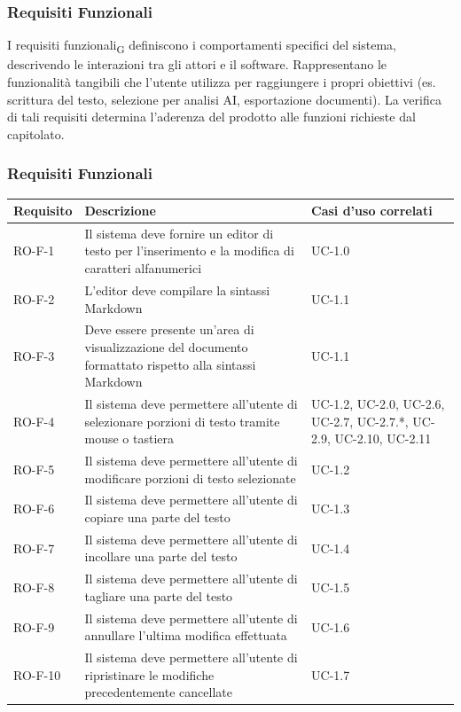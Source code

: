 \documentclass[11pt,a4paper]{article}
\begin{document}
\subsubsection{Requisiti Funzionali}
I requisiti funzionali\textsubscript{G} definiscono i comportamenti specifici del sistema, descrivendo le interazioni tra gli attori e il software.
Rappresentano le funzionalità tangibili che l'utente utilizza per raggiungere i propri obiettivi (es. scrittura del testo, selezione per analisi AI, esportazione documenti). La verifica di tali requisiti determina l'aderenza del prodotto alle funzioni richieste dal capitolato.

\subsubsection{Requisiti Funzionali}
\begin{longtable}{|p{}|>{\raggedright\arraybackslash}p{}|p{}|}
\hline
\textbf{Requisito} & \textbf{Descrizione} & \textbf{Casi d'uso correlati}\\
\hline
\endhead
RO-F-1 & Il sistema deve fornire un editor di testo per l'inserimento e la modifica di caratteri alfanumerici & UC-1.0 \\
\hline
RO-F-2 & L'editor deve compilare la sintassi Markdown & UC-1.1 \\
\hline
RO-F-3 & Deve essere presente un'area di visualizzazione del documento formattato rispetto alla sintassi Markdown & UC-1.1 \\
\hline
RO-F-4 & Il sistema deve permettere all'utente di selezionare porzioni di testo tramite mouse o tastiera & UC-1.2, UC-2.0, UC-2.6, UC-2.7, UC-2.7.*, UC-2.9, UC-2.10, UC-2.11 \\
\hline
RO-F-5 & Il sistema deve permettere all'utente di modificare porzioni di testo selezionate & UC-1.2 \\
\hline
RO-F-6 & Il sistema deve permettere all'utente di copiare una parte del testo & UC-1.3 \\
\hline
RO-F-7 & Il sistema deve permettere all'utente di incollare una parte del testo & UC-1.4 \\
\hline
RO-F-8 & Il sistema deve permettere all'utente di tagliare una parte del testo & UC-1.5 \\
\hline
RO-F-9 & Il sistema deve permettere all'utente di annullare l'ultima modifica effettuata & UC-1.6 \\
\hline
RO-F-10 & Il sistema deve permettere all'utente di ripristinare le modifiche precedentemente cancellate & UC-1.7 \\

\end{longtable}
\end{document}
